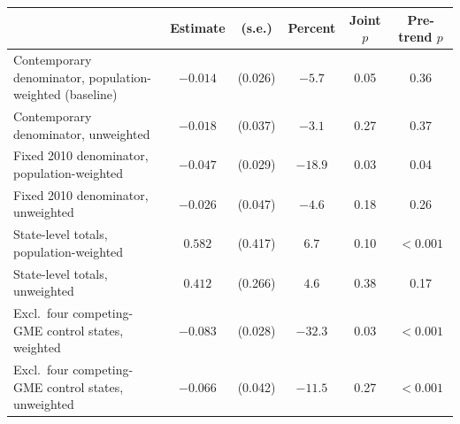\begin{tabular}{lccccc}
\toprule
 & Estimate & (s.e.) & Percent & Joint $p$ & Pre-trend $p$ \\
\midrule
Contemporary denominator, population-weighted (baseline) & $-0.014$ & (0.026) & $-5.7$ & 0.05 & 0.36 \\
Contemporary denominator, unweighted & $-0.018$ & (0.037) & $-3.1$ & 0.27 & 0.37 \\
Fixed 2010 denominator, population-weighted & $-0.047$ & (0.029) & $-18.9$ & 0.03 & 0.04 \\
Fixed 2010 denominator, unweighted & $-0.026$ & (0.047) & $-4.6$ & 0.18 & 0.26 \\
\midrule
State-level totals, population-weighted & $0.582$ & (0.417) & $6.7$ & 0.10 & $<0.001$ \\
State-level totals, unweighted & $0.412$ & (0.266) & $4.6$ & 0.38 & 0.17 \\
\midrule
Excl.\ four competing-GME control states, weighted & $-0.083$ & (0.028) & $-32.3$ & 0.03 & $<0.001$ \\
Excl.\ four competing-GME control states, unweighted & $-0.066$ & (0.042) & $-11.5$ & 0.27 & $<0.001$ \\
\bottomrule
\end{tabular}

